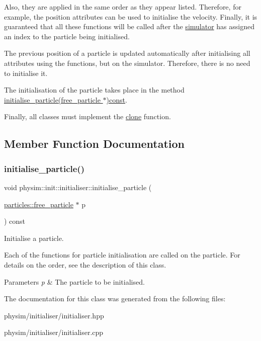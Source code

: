 Also, they are applied in the same order as they appear listed. Therefore, for example, the position attributes can be used to initialise the velocity. Finally, it is guaranteed that all these functions will be called after the \hyperlink{classphysim_1_1simulator}{simulator} has assigned an index to the particle being initialised.

The previous position of a particle is updated automatically after initialising all attributes using the functions, but on the simulator. Therefore, there is no need to initialise it.

The initialisation of the particle takes place in the method \hyperlink{classphysim_1_1init_1_1initialiser_a38515a798b81f40db3ca05812c752093}{initialise\+\_\+particle(free\+\_\+particle $\ast$)const}.

Finally, all classes must implement the \hyperlink{classphysim_1_1init_1_1initialiser_a6d68cf96cd1fa405707407a91f277f18}{clone} function. 

\subsection{Member Function Documentation}
\mbox{\label{classphysim_1_1init_1_1initialiser_a38515a798b81f40db3ca05812c752093}} 
\subsubsection{\texorpdfstring{initialise\+\_\+particle()}{initialise\_particle()}}
{\footnotesize\ttfamily void physim\+::init\+::initialiser\+::initialise\+\_\+particle (\begin{DoxyParamCaption}\item[{\hyperlink{classphysim_1_1particles_1_1free__particle}{particles\+::free\+\_\+particle} $\ast$}]{p }\end{DoxyParamCaption}) const}



Initialise a particle. 

Each of the functions for particle initialisation are called on the particle. For details on the order, see the description of this class. 
\begin{DoxyParams}{Parameters}
{\em p} & The particle to be initialised. \\
\hline
\end{DoxyParams}


The documentation for this class was generated from the following files\+:\begin{DoxyCompactItemize}
\item 
physim/initialiser/initialiser.\+hpp\item 
physim/initialiser/initialiser.\+cpp\end{DoxyCompactItemize}
